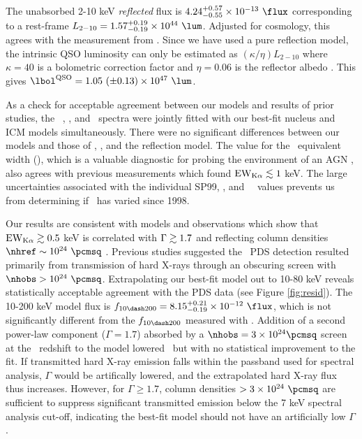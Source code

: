 \documentclass[useAMS,usenatbib]{mn2e}
\begin{document}
The unabsorbed 2-10 keV {\it{reflected}} flux is $4.24^{+0.57}_{-0.55}
\times 10^{-13} ~\flux$ corresponding to a rest-frame $L_{2-10} =
1.57^{+0.19}_{-0.19} \times 10^{44} ~\lum$. Adjusted for cosmology,
this agrees with the measurement from
\citet{2001MNRAS.321L..15I}. Since we have used a pure reflection
model, the intrinsic QSO luminosity can only be estimated as
$(\kappa/\eta) L_{2-10}$ where $\kappa = 40$ is a bolometric
correction factor \citep{2007MNRAS.381.1235V} and $\eta = 0.06$ is the
reflector albedo \citep{2009MNRAS.397.1549M}. This gives $\lqso = 1.05
~(\pm 0.13) \times 10^{47} ~\lum$.

As a check for acceptable agreement between our models and results of
prior studies, the \rf\ \chandra, \xmm, and \bepposax\ spectra were
jointly fitted with our best-fit nucleus and ICM models
simultaneously. There were no significant differences between our
models and those of \citet{2000A&A...353..910F},
\citet{2001MNRAS.321L..15I}, and the \citet{2007A&A...473...85P}
reflection model. The value for the \feka\ equivalent width (\fekaew),
which is a valuable diagnostic for probing the environment of an AGN
\citep[see][for a review]{2000PASP..112.1145F}, also agrees with
previous measurements which found $\mathrm{EW}_{\mathrm{K}\alpha} \lesssim 1$ keV. The large
uncertainties associated with the individual SP99, \xmm, and
\bepposax\ \fekaew\ values prevents us from determining if
\fekaew\ has varied since 1998.

Our results are consistent with models and observations which show
that $\mathrm{EW}_{\mathrm{K}\alpha} \gtrsim 0.5$ keV is correlated with $\Gamma \gtrsim 1.7$ and
reflecting column densities $\nhref \sim 10^{24} ~\pcmsq$
\citep{1996MNRAS.280..823M, 1997ApJ...477..602N, 1999MNRAS.303L..11Z,
  2005A&A...444..119G}. Previous studies suggested the \bepposax\ PDS
detection resulted primarily from transmission of hard X-rays through
an obscuring screen with $\nhobs > 10^{24} ~\pcmsq$. Extrapolating our
best-fit model out to 10-80 keV reveals statistically acceptable
agreement with the PDS data (see Figure \ref{fig:resid}). The 10-200
keV model flux is $f_{10 \dash 200} = 8.15^{+0.21}_{-0.19} \times
10^{-12} ~\flux$, which is not significantly different from the $f_{10
  \dash 200}$ measured with \bepposax. Addition of a second power-law
component ($\Gamma = 1.7$) absorbed by a $\nhobs = 3 \times 10^{24}
\pcmsq$ screen at the \irs\ redshift to the model lowered \chisq\ but
with no statistical improvement to the fit. If transmitted hard X-ray
emission falls within the passband used for spectral analysis,
$\Gamma$ would be artifically lowered, and the extrapolated hard X-ray
flux thus increases. However, for $\Gamma \ge 1.7$, column densities
$> 3 \times 10^{24} ~\pcmsq$ are sufficient to suppress significant
transmitted emission below the 7 keV spectral analysis cut-off,
indicating the best-fit model should not have an artificially low
$\Gamma$.
\end{document}
